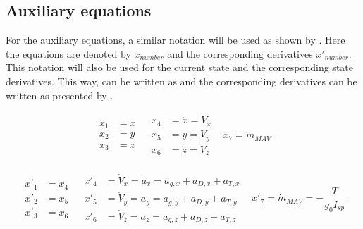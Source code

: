 \subsection{Auxiliary equations}
\label{subsec:auxEq}
For the auxiliary equations, a similar notation will be used as shown by \cite{scott2008high}. Here the equations are denoted by $x_{number}$ and the corresponding derivatives $x'_{number}$. This notation will also be used for the current state and the corresponding state derivatives. This way,  can be written as  and the corresponding derivatives can be written as presented by .

\begin{align} \label{eq:stateX}
\begin{split} 
x_{1}&=x\\
x_{2}&=y\\
x_{3}&=z
\end{split} 
&
\begin{split}
x_{4}&=\dot{x}=V_{x}\\
x_{5}&=\dot{y}=V_{y}\\
x_{6}&=\dot{z}=V_{z}
\end{split}
&
x_{7}=m_{MAV}
\end{align}


\begin{align} \label{eq:state_derivativesX}
\begin{split} 
x'_{1}&=x_{4}\\
x'_{2}&=x_{5}\\
x'_{3}&=x_{6}
\end{split} 
&
\begin{split}
x'_{4}&=\dot{V}_{x}=a_{x}=a_{g,x}+a_{D,x}+a_{T,x}\\
x'_{5}&=\dot{V}_{y}=a_{y}=a_{g,y}+a_{D,y}+a_{T,y}\\
x'_{6}&=\dot{V}_{z}=a_{z}=a_{g,z}+a_{D,z}+a_{T,z}
\end{split}
&
x'_{7}=\dot{m}_{MAV}=-\dfrac{T}{g_{0}I_{sp}}
\end{align}

